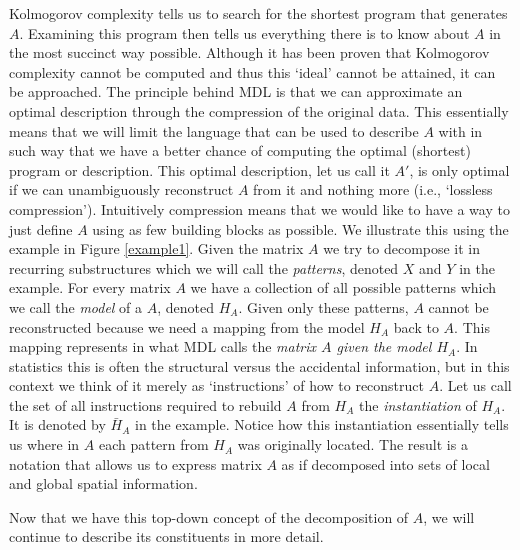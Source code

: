 \documentclass[a4paper,notoc,oneside]{tufte-book}
\begin{document}
Kolmogorov complexity tells us to search for the shortest program that generates $A$. Examining this program then tells us everything there is to know about $A$ in the most succinct way possible. Although it has been proven that Kolmogorov complexity cannot be computed and thus this `ideal' cannot be attained, it can be approached. The principle behind MDL is that we can approximate an optimal description through the compression of the original data. This essentially means that we will limit the language that can be used to describe $A$ with in such way that we have a better chance of computing the optimal (shortest) program or description. This optimal description, let us call it $A'$, is only optimal if we can unambiguously reconstruct $A$ from it and nothing more (i.e., `lossless compression'). Intuitively compression means that we would like to have a way to just define $A$ using as few building blocks as possible. We illustrate this using the example in Figure \ref{example1}. Given the matrix $A$ we try to decompose it in recurring substructures which we will call the \emph{patterns}, denoted $X$ and $Y$ in the example. For every matrix $A$ we have a collection of all possible patterns which we call the \emph{model} of a $A$, denoted $H_A$. Given only these patterns, $A$ cannot be reconstructed because we need a mapping from the model $H_A$ back to $A$. This mapping represents in what MDL calls the \emph{matrix $A$ given the model $H_A$}. In statistics this is often the structural versus the accidental information, but in this context we think of it merely as `instructions' of how to reconstruct $A$. Let us call the set of all instructions required to rebuild $A$ from $H_A$ the \emph{instantiation} of $H_A$. It is denoted by $\bar{H}_A$ in the example. Notice how this instantiation essentially tells us where in $A$ each pattern from $H_A$ was originally located.  The result is a notation that allows us to express matrix $A$ as if decomposed into sets of local and global spatial information.

Now that we have this top-down concept of the decomposition of $A$, we will continue to describe its constituents in more detail.

\end{document}
